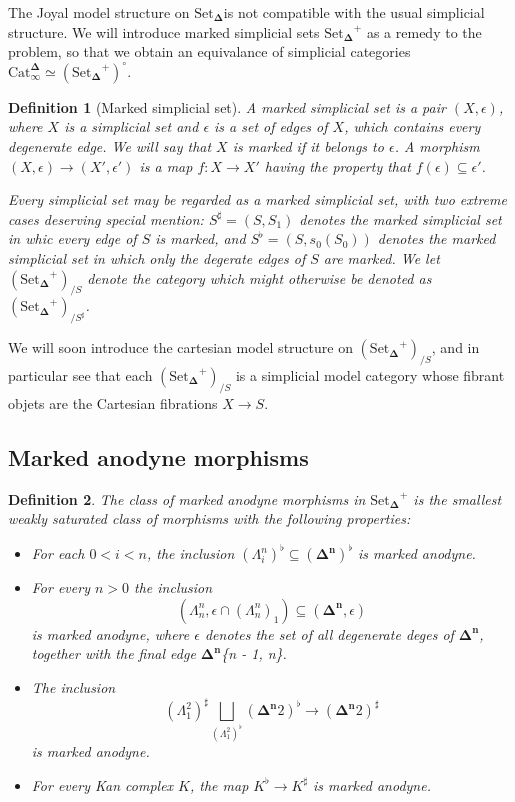 \documentclass[12pt]{amsart}
\newcommand{\8}{\ensuremath{\infty}}
\newcommand{\Horn}[2]{\ensuremath{\Lambda^{#1}_{#2}}}
\newcommand{\Simplex}[1][n]{\ensuremath{\boldsymbol{\Delta^{#1}}}}
\newcommand{\SSet}{\ensuremath{\text{Set}_{\boldsymbol{\Delta}}}}
\newcommand{\Catinfdel}{\ensuremath{\text{Cat}^{\boldsymbol{\Delta}}_{\infty}}}
\newtheorem{definition}{Definition}
\begin{document}
The Joyal model structure on \SSet is not compatible with the usual simplicial structure. We will introduce marked simplicial sets $\SSet^+$ as a remedy to the problem, so that we obtain an equivalance of simplicial categories $\Catinfdel \simeq (\SSet^+)^\circ$.

\begin{definition}[Marked simplicial set]
  A marked simplicial set is a pair $(X, \epsilon)$, where $X$ is a simplicial set and $\epsilon$ is a set of edges of $X$, which contains every degenerate edge. We will say that $X$ is marked if it belongs to $\epsilon$. A morphism $(X, \epsilon) \rightarrow (X', \epsilon')$ is a map $f : X \rightarrow X'$ having the property that $f(\epsilon) \subseteq \epsilon'$.

  Every simplicial set may be regarded as a marked simplicial set, with two extreme cases deserving special mention: $S^\sharp = (S, S_1)$ denotes the marked simplicial set in whic every edge of $S$ is marked, and $S^\flat = (S, s_0(S_0))$ denotes the marked simplicial set in which only the degerate edges of $S$ are marked. We let $(\SSet^+)_{/S}$ denote the category which might otherwise be denoted as $(\SSet^+)_{/S^\sharp}$.
\end{definition}

We will soon introduce the cartesian model structure on $(\SSet^+)_{/S}$, and in particular see that each $(\SSet^+)_{/S}$ is a simplicial model category whose fibrant objets are the Cartesian fibrations $X \rightarrow S$.

\subsection{Marked anodyne morphisms}

\begin{definition}
  The class of marked anodyne morphisms in $\SSet^+$ is the smallest weakly saturated class of morphisms with the following properties:

  \begin{itemize}
    \item For each $0 < i < n$, the inclusion $(\Horn{n}{i})^\flat \subseteq (\Simplex)^\flat$ is marked anodyne.
    \item For every $n > 0$ the inclusion
          $$
            (\Horn{n}{n}, \epsilon \cap (\Horn{n}{n})_1) \subseteq (\Simplex, \epsilon)
          $$
          is marked anodyne, where $\epsilon$ denotes the set of all degenerate deges of \Simplex, together with the final edge \Simplex{\{n - 1, n\}}.
    \item The inclusion
          $$
            (\Horn{2}{1})^\sharp \bigsqcup_{(\Horn{2}{1})^\flat} (\Simplex{2})^\flat \rightarrow (\Simplex{2})^\sharp
          $$
          is marked anodyne.
    \item For every Kan complex $K$, the map $K^\flat \rightarrow K^\sharp$ is marked anodyne.
  \end{itemize}
\end{definition}
\end{document}

